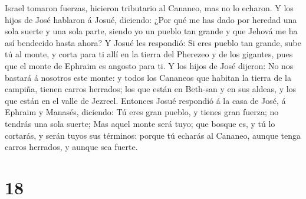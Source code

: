Israel tomaron fuerzas, hicieron tributario al Cananeo, mas no lo
echaron.  Y los hijos de José hablaron á Josué, diciendo:
¿Por qué me has dado por heredad una sola suerte y una sola parte,
siendo yo un pueblo tan grande y que Jehová me ha así bendecido hasta
ahora?  Y Josué les respondió: Si eres pueblo tan grande,
sube tú al monte, y corta para ti allí en la tierra del Pherezeo y de
los gigantes, pues que el monte de Ephraim es angosto para ti.
 Y los hijos de José dijeron: No nos bastará á nosotros
este monte: y todos los Cananeos que habitan la tierra de la campiña,
tienen carros herrados; los que están en Beth-san y en sus aldeas, y los
que están en el valle de Jezreel.  Entonces Josué
respondió á la casa de José, á Ephraim y Manasés, diciendo: Tú eres gran
pueblo, y tienes gran fuerza; no tendrás una sola suerte;
 Mas aquel monte será tuyo; que bosque es, y tú lo
cortarás, y serán tuyos sus términos: porque tú echarás al Cananeo,
aunque tenga carros herrados, y aunque sea fuerte.

\hypertarget{section-17}{%
\section{18}\label{section-17}}

